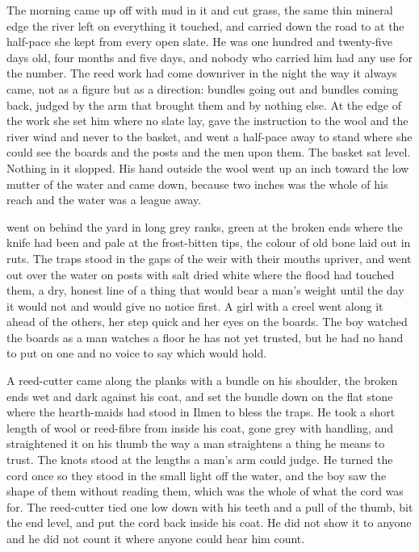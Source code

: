 
The morning came up off  with mud in it and cut grass, the same thin mineral edge the river left on everything it touched, and  carried  down the road to  at the half-pace she kept from every open slate. He was one hundred and twenty-five days old, four months and five days, and nobody who carried him had any use for the number. The reed work had come downriver in the night the way it always came, not as a figure but as a direction: bundles going out and bundles coming back, judged by the arm that brought them and by nothing else. At the edge of the work she set him where no slate lay, gave the instruction to the wool and the river wind and never to the basket, and went a half-pace away to stand where she could see the boards and the posts and the men upon them. The basket sat level. Nothing in it slopped. His hand outside the wool went up an inch toward the low mutter of the water and came down, because two inches was the whole of his reach and the water was a league away.

 went on behind the yard in long grey ranks, green at the broken ends where the knife had been and pale at the frost-bitten tips, the colour of old bone laid out in ruts. The traps stood in the gaps of the weir with their mouths upriver, and  went out over the water on posts with salt dried white where the flood had touched them, a dry, honest line of a thing that would bear a man's weight until the day it would not and would give no notice first. A girl with a creel went along it ahead of the others, her step quick and her eyes on the boards. The boy watched the boards as a man watches a floor he has not yet trusted, but he had no hand to put on one and no voice to say which would hold.

A reed-cutter came along the planks with a bundle on his shoulder, the broken ends wet and dark against his coat, and set the bundle down on the flat stone where the hearth-maids had stood in Ilmen to bless the traps. He took a short length of wool or reed-fibre from inside his coat, gone grey with handling, and straightened it on his thumb the way a man straightens a thing he means to trust. The knots stood at the lengths a man's arm could judge. He turned the cord once so they stood in the small light off the water, and the boy saw the shape of them without reading them, which was the whole of what the cord was for. The reed-cutter tied one low down with his teeth and a pull of the thumb, bit the end level, and put the cord back inside his coat. He did not show it to anyone and he did not count it where anyone could hear him count.

